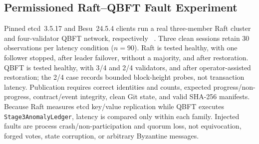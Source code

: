 \documentclass[journal]{IEEEtran}
\begin{document}
\subsection{Permissioned Raft--QBFT Fault Experiment}
Pinned etcd~3.5.17 and Besu~24.5.4 clients run a real three-member Raft
cluster and four-validator QBFT network, respectively
~\cite{ongaro2014raft,besuQbft,artifactRepo}. Three clean sessions retain 30
observations per latency condition ($n=90$). Raft is tested healthy, with one
follower stopped, after leader failover, without a majority, and after
restoration. QBFT is tested healthy, with 3/4 and 2/4 validators, and after
operator-assisted restoration; the 2/4 case records bounded block-height
probes, not transaction latency. Publication requires correct identities and
counts, expected progress/non-progress, contract/event integrity, clean Git
state, and valid SHA-256 manifests. Because Raft measures etcd key/value
replication while QBFT executes \texttt{Stage3AnomalyLedger}, latency is
compared only within each family. Injected faults are process
crash/non-participation and quorum loss, not equivocation, forged votes,
state corruption, or arbitrary Byzantine messages.
\end{document}
